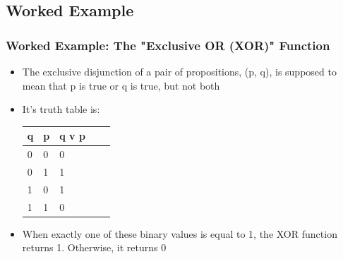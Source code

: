 \documentclass[
  shownotes,
  xcolor={svgnames},
  hyperref={colorlinks,citecolor=DarkBlue,linkcolor=DarkRed,urlcolor=DarkBlue}
  , aspectratio=169]{beamer}
\begin{document}
\subsection{Worked Example}
\begin{frame}
\frametitle{Worked Example: The "Exclusive OR (XOR)" Function}
\begin{itemize}
\item The exclusive disjunction of a pair of propositions, (p, q), is supposed to mean that p is true or q is true, but not both
\item It's truth table is:

\begin{table}[H]
\begin{tabular}{lllll}
q  & p & q v p \\
\hline
0 & 0 & 0 \\
0 & 1 & 1 \\
1 & 0 & 1 \\
1 & 1 & 0 \\
\end{tabular}
\end{table}
\item When exactly one of these binary values is equal to 1, the XOR function
returns 1. Otherwise, it returns 0
\end{itemize}

\end{frame}
\end{document}
